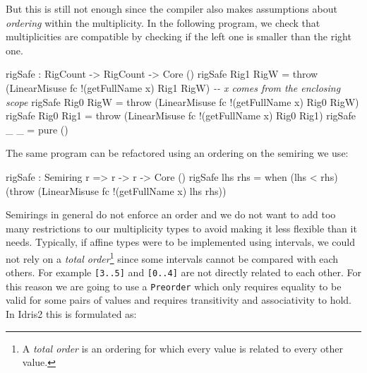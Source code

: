 \documentclass[
]{article}
\newenvironment{Shaded}{}{}
\newcommand{\CommentTok}[1]{\textcolor[rgb]{0.38,0.63,0.69}{\textit{#1}}}
\newcommand{\DataTypeTok}[1]{\textcolor[rgb]{0.56,0.13,0.00}{#1}}
\newcommand{\FunctionTok}[1]{\textcolor[rgb]{0.02,0.16,0.49}{#1}}
\newcommand{\NormalTok}[1]{#1}
\newcommand{\OperatorTok}[1]{\textcolor[rgb]{0.40,0.40,0.40}{#1}}
\newcommand{\OtherTok}[1]{\textcolor[rgb]{0.00,0.44,0.13}{#1}}
\begin{document}
But this is still not enough since the compiler also makes assumptions
about \emph{ordering} within the multiplicity. In the following program,
we check that multiplicities are compatible by checking if the left one
is smaller than the right one.

\begin{Shaded}
\begin{Highlighting}[]

\NormalTok{rigSafe }\OperatorTok{:} \DataTypeTok{RigCount} \OtherTok{{-}\textgreater{}} \DataTypeTok{RigCount} \OtherTok{{-}\textgreater{}} \DataTypeTok{Core}\NormalTok{ ()}
\NormalTok{  rigSafe }\DataTypeTok{Rig1} \DataTypeTok{RigW} \OtherTok{=}\NormalTok{ throw }
\NormalTok{    (}\DataTypeTok{LinearMisuse}\NormalTok{ fc }\OperatorTok{!}\NormalTok{(getFullName x) }\DataTypeTok{Rig1} \DataTypeTok{RigW}\NormalTok{)}
    \CommentTok{{-}{-} \textasciigrave{}x\textasciigrave{} comes from the enclosing scope}
\NormalTok{rigSafe }\DataTypeTok{Rig0} \DataTypeTok{RigW} \OtherTok{=}\NormalTok{ throw}
\NormalTok{    (}\DataTypeTok{LinearMisuse}\NormalTok{ fc }\OperatorTok{!}\NormalTok{(getFullName x) }\DataTypeTok{Rig0} \DataTypeTok{RigW}\NormalTok{)}
\NormalTok{rigSafe }\DataTypeTok{Rig0} \DataTypeTok{Rig1} \OtherTok{=}\NormalTok{ throw }
\NormalTok{    (}\DataTypeTok{LinearMisuse}\NormalTok{ fc }\OperatorTok{!}\NormalTok{(getFullName x) }\DataTypeTok{Rig0} \DataTypeTok{Rig1}\NormalTok{)}
\NormalTok{rigSafe \_ \_ }\OtherTok{=} \FunctionTok{pure}\NormalTok{ ()}
\end{Highlighting}
\end{Shaded}

The same program can be refactored using an ordering on the semiring we
use:

\begin{Shaded}
\begin{Highlighting}[]
\NormalTok{rigSafe }\OperatorTok{:} \DataTypeTok{Semiring}\NormalTok{ r }\OtherTok{=\textgreater{}}\NormalTok{ r }\OtherTok{{-}\textgreater{}}\NormalTok{ r }\OtherTok{{-}\textgreater{}} \DataTypeTok{Core}\NormalTok{ ()}
\NormalTok{rigSafe lhs rhs }\OtherTok{=} 
\NormalTok{  when (lhs }\OperatorTok{\textless{}}\NormalTok{ rhs)}
\NormalTok{       (throw (}\DataTypeTok{LinearMisuse}\NormalTok{ fc }\OperatorTok{!}\NormalTok{(getFullName x) lhs rhs))}
\end{Highlighting}
\end{Shaded}

Semirings in general do not enforce an order and we do not want to add
too many restrictions to our multiplicity types to avoid making it less
flexible than it needs. Typically, if affine types were to be
implemented using intervals, we could not rely on a \emph{total
order}\footnote{A \emph{total order} is an ordering for which every
  value is related to every other value.} since some intervals cannot be
compared with each others. For example \texttt{{[}3..5{]}} and
\texttt{{[}0..4{]}} are not directly related to each other. For this
reason we are going to use a \texttt{Preorder} which only requires
equality to be valid for some pairs of values and requires transitivity
and associativity to hold. In Idris2 this is formulated as:
\end{document}
